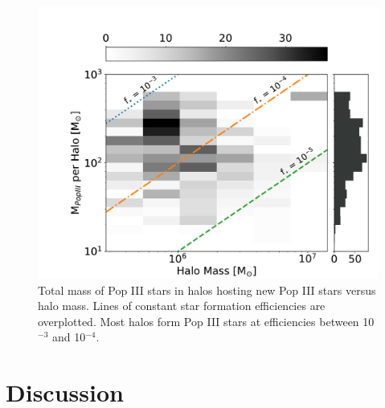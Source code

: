 \documentclass[a4paper,fleqn,usenatbib]{mnras}
\begin{document}
\begin{figure}
	\includegraphics[width=\columnwidth]{images/totp3mass_halomass_sidehist.pdf}
    \caption{Total mass of Pop III stars in halos hosting new Pop III stars versus halo mass. Lines of constant star formation efficiencies are overplotted. Most halos form Pop III stars at efficiencies between 10$^{-3}$ and 10$^{-4}$.}
    \label{fig:totp3mass_halomass_sidehist}
\end{figure}

\section{Discussion}

\end{document}
